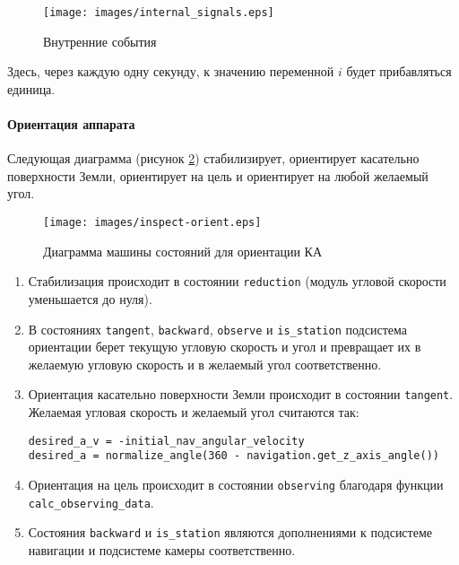 \documentclass[12pt,a4paper]{article}
\begin{document}
\begin{figure}[tbh]
  \begin{center}
    \texttt{[image: images/internal\_signals.eps]}
    \caption{Внутренние события}
    \label{Pic:IfElse}
  \end{center}
\end{figure}

Здесь, через каждую одну секунду, к значению переменной $i$ будет прибавляться единица.

\clearpage

\paragraph{Ориентация аппарата} Следующая диаграмма (рисунок \ref{Pic:INSPECT-orient}) стабилизирует, ориентирует касательно поверхности Земли, ориентирует на цель и ориентирует на любой желаемый угол.

\begin{figure}[tbh]
  \begin{center}
    \texttt{[image: images/inspect-orient.eps]}
    \caption{Диаграмма машины состояний для ориентации КА}
    \label{Pic:INSPECT-orient}
  \end{center}
\end{figure}

\begin{enumerate}
\item Стабилизация происходит в состоянии \verb'reduction' (модуль угловой скорости уменьшается до нуля).

\item В состояниях \verb'tangent', \verb'backward', \verb'observe' и \verb'is_station' подсистема ориентации берет текущую угловую скорость и угол и превращает их в желаемую угловую скорость и в желаемый угол соответственно.

\item Ориентация касательно поверхности Земли происходит в состоянии \verb'tangent'. Желаемая угловая скорость и желаемый угол считаются так:
\begin{verbatim}
desired_a_v = -initial_nav_angular_velocity
desired_a = normalize_angle(360 - navigation.get_z_axis_angle())
\end{verbatim}
\item Ориентация на цель происходит в состоянии \verb'observing' благодаря функции \verb'calc_observing_data'.
\item Состояния \verb'backward' и \verb'is_station' являются дополнениями к подсистеме навигации и подсистеме камеры соответственно.
\end{enumerate}
\end{document}

